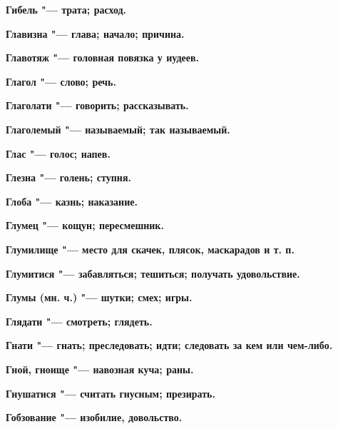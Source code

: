 \begin{mymulticols}{2}
\bfseries Гибель\normalfont{} "--- трата; расход. 




\bfseries Главизна\normalfont{} "--- глава; начало; причина. 




\bfseries Главотяж\normalfont{} "--- головная повязка у иудеев. 




\bfseries Глагол\normalfont{} "--- слово; речь. 




\bfseries Глаголати\normalfont{} "--- говорить; рассказывать. 




\bfseries Глаголемый\normalfont{} "--- называемый; так называемый. 




\bfseries Глас\normalfont{} "--- голос; напев. 




\bfseries Глезна\normalfont{} "--- голень; ступня. 




\bfseries Глоба\normalfont{} "--- казнь; наказание. 




\bfseries Глумец\normalfont{} "--- кощун; пересмешник. 




\bfseries Глумилище\normalfont{} "--- место для скачек, плясок, маскарадов и т. п. 




\bfseries Глумитися\normalfont{} "--- забавляться; тешиться; получать удовольствие. 




\bfseries Глумы\normalfont{} (мн. ч.) "--- шутки; смех; игры. 




\bfseries Глядати\normalfont{} "--- смотреть; глядеть. 




\bfseries Гнати\normalfont{} "--- гнать; преследовать; идти; следовать за кем или чем-либо. 




\bfseries Гной, гноище\normalfont{} "--- навозная куча; раны. 




\bfseries Гнушатися\normalfont{} "--- считать гнусным; презирать. 




\bfseries Гобзование\normalfont{} "--- изобилие, довольство. 





\end{mymulticols}
